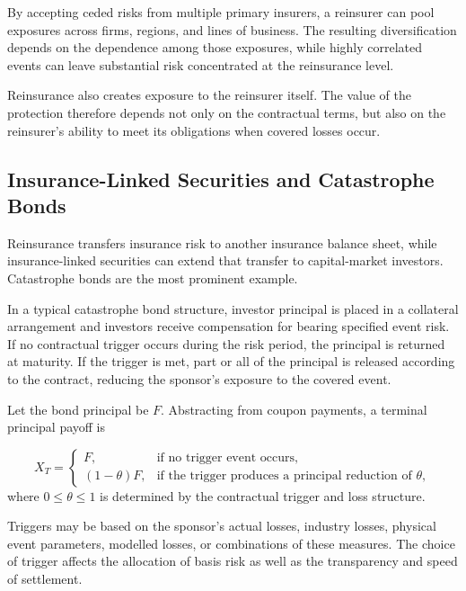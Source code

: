 By accepting ceded risks from multiple primary insurers, a reinsurer can pool exposures across firms, regions, and lines of business. The resulting diversification depends on the dependence among those exposures, while highly correlated events can leave substantial risk concentrated at the reinsurance level.

Reinsurance also creates exposure to the reinsurer itself. The value of the protection therefore depends not only on the contractual terms, but also on the reinsurer's ability to meet its obligations when covered losses occur.


\subsection[Insurance-Linked Securities and Catastrophe Bonds]{Insurance-Linked Securities and Catastrophe \\Bonds}

Reinsurance transfers insurance risk to another insurance balance sheet, while insurance-linked securities can extend that transfer to capital-market investors. Catastrophe bonds are the most prominent example.

In a typical catastrophe bond structure, investor principal is placed in a collateral arrangement and investors receive compensation for bearing specified event risk. If no contractual trigger occurs during the risk period, the principal is returned at maturity. If the trigger is met, part or all of the principal is released according to the contract, reducing the sponsor's exposure to the covered event.

Let the bond principal be $F$. Abstracting from coupon payments, a terminal principal payoff is

\begin{equation}
X_T=
\begin{cases}
F, & \text{if no trigger event occurs},\\
(1-\theta)F, & \text{if the trigger produces a principal reduction of } \theta,
\end{cases}
\label{eq:ch15-cat-bond-payoff}
\end{equation}
where $0\leq\theta\leq1$ is determined by the contractual trigger and loss structure.

Triggers may be based on the sponsor's actual losses, industry losses, physical event parameters, modelled losses, or combinations of these measures. The choice of trigger affects the allocation of basis risk as well as the transparency and speed of settlement.

